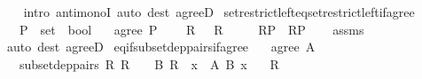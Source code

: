 \begin{isabellebody}
%
\isadelimproof
\ \ %
\endisadelimproof
%
\isatagproof
{}\isamarkupfalse%
\ {\isacharparenleft}{\kern0pt}intro\ antimonoI{\isacharparenright}{\kern0pt}\ {\isacharparenleft}{\kern0pt}auto\ dest{\isacharcolon}{\kern0pt}\ agreeD{\isacharparenright}{\kern0pt}%
\endisatagproof
{\isafoldproof}%
%
\isadelimproof
\isanewline
%
\endisadelimproof
\isanewline
{}\isamarkupfalse%
\ set{\isacharunderscore}{\kern0pt}restrict{\isacharunderscore}{\kern0pt}left{\isacharunderscore}{\kern0pt}eq{\isacharunderscore}{\kern0pt}set{\isacharunderscore}{\kern0pt}restrict{\isacharunderscore}{\kern0pt}left{\isacharunderscore}{\kern0pt}if{\isacharunderscore}{\kern0pt}agree{\isacharcolon}{\kern0pt}\isanewline
\ \ \ P\ {\isacharcolon}{\kern0pt}{\isacharcolon}{\kern0pt}\ {\isachardoublequoteopen}set\ {\isasymRightarrow}\ bool{\isachardoublequoteclose}\isanewline
\ \ \ {\isachardoublequoteopen}agree\ P\ {\isasymR}{\isachardoublequoteclose}\isanewline
\ \ \ {\isachardoublequoteopen}R\ {\isasymin}\ {\isasymR}{\isachardoublequoteclose}\ {\isachardoublequoteopen}R{\isacharprime}{\kern0pt}\ {\isasymin}\ {\isasymR}{\isachardoublequoteclose}\isanewline
\ \ \ {\isachardoublequoteopen}R{\isasymrestriction}\isactrlbsub P\isactrlesub \ {\isacharequal}{\kern0pt}\ R{\isacharprime}{\kern0pt}{\isasymrestriction}\isactrlbsub P\isactrlesub {\isachardoublequoteclose}\isanewline
%
\isadelimproof
\ \ %
\endisadelimproof
%
\isatagproof
{}\isamarkupfalse%
\ assms\ \isamarkupfalse%
\ {\isacharparenleft}{\kern0pt}auto\ dest{\isacharcolon}{\kern0pt}\ agreeD{\isacharparenright}{\kern0pt}%
\endisatagproof
{\isafoldproof}%
%
\isadelimproof
\isanewline
%
\endisadelimproof
\isanewline
{}\isamarkupfalse%
\ eq{\isacharunderscore}{\kern0pt}if{\isacharunderscore}{\kern0pt}subset{\isacharunderscore}{\kern0pt}dep{\isacharunderscore}{\kern0pt}pairs{\isacharunderscore}{\kern0pt}if{\isacharunderscore}{\kern0pt}agree{\isacharcolon}{\kern0pt}\isanewline
\ \ \ {\isachardoublequoteopen}agree\ A\ {\isasymR}{\isachardoublequoteclose}\isanewline
\ \ \ subset{\isacharunderscore}{\kern0pt}dep{\isacharunderscore}{\kern0pt}pairs{\isacharcolon}{\kern0pt}\ {\isachardoublequoteopen}{\isasymAnd}R{\isachardot}{\kern0pt}\ R\ {\isasymin}\ {\isasymR}\ {\isasymLongrightarrow}\ {\isasymexists}B{\isachardot}{\kern0pt}\ R\ {\isasymsubseteq}\ {\isasymSum}x\ {\isasymin}\ A{\isachardot}{\kern0pt}\ B\ x{\isachardoublequoteclose}\isanewline
\ \ \ {\isachardoublequoteopen}R\ {\isasymin}\ {\isasymR}{\isachardoublequoteclose}\isanewline

\end{isabellebody}
